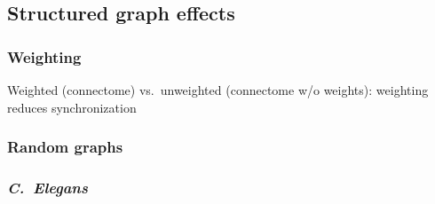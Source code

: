 \documentclass[pdflatex,lineno,referee,sn-mathphys-ay]{sn-jnl}
\begin{document}


\subsection{Structured graph effects}
\subsubsection{Weighting}
Weighted (connectome) vs.\ unweighted (connectome w/o
  weights): weighting reduces synchronization
\subsubsection{Random graphs}
\subsubsection{\emph{C.\ Elegans}}
\end{document}
